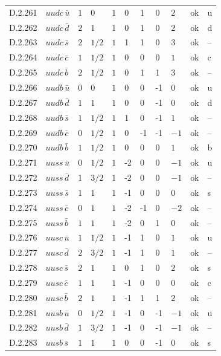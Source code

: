 {\begin{longtable}{@{}llllllllll>{\raggedright\arraybackslash}p{2.0cm}@{}}
D.2.261 & $uudc\,\bar{u}$ & $1$ & $0$ & $1$ & 0 & 1 & 0 & $2$ & ok & u \\
D.2.262 & $uudc\,\bar{d}$ & $2$ & $1$ & $1$ & 0 & 1 & 0 & $2$ & ok & d \\
D.2.263 & $uudc\,\bar{s}$ & $2$ & $1/2$ & $1$ & 1 & 1 & 0 & $3$ & ok & -- \\
D.2.264 & $uudc\,\bar{c}$ & $1$ & $1/2$ & $1$ & 0 & 0 & 0 & $1$ & ok & c \\
D.2.265 & $uudc\,\bar{b}$ & $2$ & $1/2$ & $1$ & 0 & 1 & 1 & $3$ & ok & -- \\
D.2.266 & $uudb\,\bar{u}$ & $0$ & $0$ & $1$ & 0 & 0 & -1 & $0$ & ok & u \\
D.2.267 & $uudb\,\bar{d}$ & $1$ & $1$ & $1$ & 0 & 0 & -1 & $0$ & ok & d \\
D.2.268 & $uudb\,\bar{s}$ & $1$ & $1/2$ & $1$ & 1 & 0 & -1 & $1$ & ok & -- \\
D.2.269 & $uudb\,\bar{c}$ & $0$ & $1/2$ & $1$ & 0 & -1 & -1 & $-1$ & ok & -- \\
D.2.270 & $uudb\,\bar{b}$ & $1$ & $1/2$ & $1$ & 0 & 0 & 0 & $1$ & ok & b \\
D.2.271 & $uuss\,\bar{u}$ & $0$ & $1/2$ & $1$ & -2 & 0 & 0 & $-1$ & ok & u \\
D.2.272 & $uuss\,\bar{d}$ & $1$ & $3/2$ & $1$ & -2 & 0 & 0 & $-1$ & ok & -- \\
D.2.273 & $uuss\,\bar{s}$ & $1$ & $1$ & $1$ & -1 & 0 & 0 & $0$ & ok & s \\
D.2.274 & $uuss\,\bar{c}$ & $0$ & $1$ & $1$ & -2 & -1 & 0 & $-2$ & ok & -- \\
D.2.275 & $uuss\,\bar{b}$ & $1$ & $1$ & $1$ & -2 & 0 & 1 & $0$ & ok & -- \\
D.2.276 & $uusc\,\bar{u}$ & $1$ & $1/2$ & $1$ & -1 & 1 & 0 & $1$ & ok & u \\
D.2.277 & $uusc\,\bar{d}$ & $2$ & $3/2$ & $1$ & -1 & 1 & 0 & $1$ & ok & -- \\
D.2.278 & $uusc\,\bar{s}$ & $2$ & $1$ & $1$ & 0 & 1 & 0 & $2$ & ok & s \\
D.2.279 & $uusc\,\bar{c}$ & $1$ & $1$ & $1$ & -1 & 0 & 0 & $0$ & ok & c \\
D.2.280 & $uusc\,\bar{b}$ & $2$ & $1$ & $1$ & -1 & 1 & 1 & $2$ & ok & -- \\
D.2.281 & $uusb\,\bar{u}$ & $0$ & $1/2$ & $1$ & -1 & 0 & -1 & $-1$ & ok & u \\
D.2.282 & $uusb\,\bar{d}$ & $1$ & $3/2$ & $1$ & -1 & 0 & -1 & $-1$ & ok & -- \\
D.2.283 & $uusb\,\bar{s}$ & $1$ & $1$ & $1$ & 0 & 0 & -1 & $0$ & ok & s \\

\end{longtable}}
